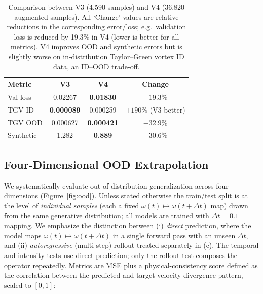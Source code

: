 \documentclass[review]{elsarticle}
\begin{document}
\begin{table}[t]
\centering
\caption{Comparison between V3 (4,590 samples) and V4 (36,820 augmented samples). All `Change' values are relative reductions in the corresponding error/loss; e.g.\ validation loss is reduced by 19.3\% in V4 (lower is better for all metrics). V4 improves OOD and synthetic errors but is slightly worse on in-distribution Taylor--Green vortex ID data, an ID--OOD trade-off.}
\label{tab:v3v4}
\begin{tabular}{lccc}
\toprule
Metric & V3 & V4 & Change \\
\midrule
Val loss & 0.02267 & \textbf{0.01830} & $-$19.3\% \\
TGV ID & \textbf{0.000089} & 0.000259 & $+190\%$ (V3 better) \\
TGV OOD & 0.000627 & \textbf{0.000421} & $-$32.9\% \\
Synthetic & 1.282 & \textbf{0.889} & $-$30.6\% \\
\bottomrule
\end{tabular}
\end{table}

\subsection{Four-Dimensional OOD Extrapolation}
\label{sec:ood}

We systematically evaluate out-of-distribution generalization across four dimensions (Figure~\ref{fig:ood}). Unless stated otherwise the train/test split is at the level of \emph{individual samples} (each a fixed $\omega(t)\mapsto\omega(t+\Delta t)$ map) drawn from the same generative distribution; all models are trained with $\Delta t=0.1$ mapping. We emphasize the distinction between (i) \emph{direct} prediction, where the model maps $\omega(t)\mapsto\omega(t+\Delta t)$ in a single forward pass with an unseen $\Delta t$, and (ii) \emph{autoregressive} (multi-step) rollout treated separately in (c). The temporal and intensity tests use direct prediction; only the rollout test composes the operator repeatedly. Metrics are MSE plus a physical-consistency score defined as the correlation between the predicted and target velocity divergence pattern, scaled to $[0,1]$:
\end{document}
